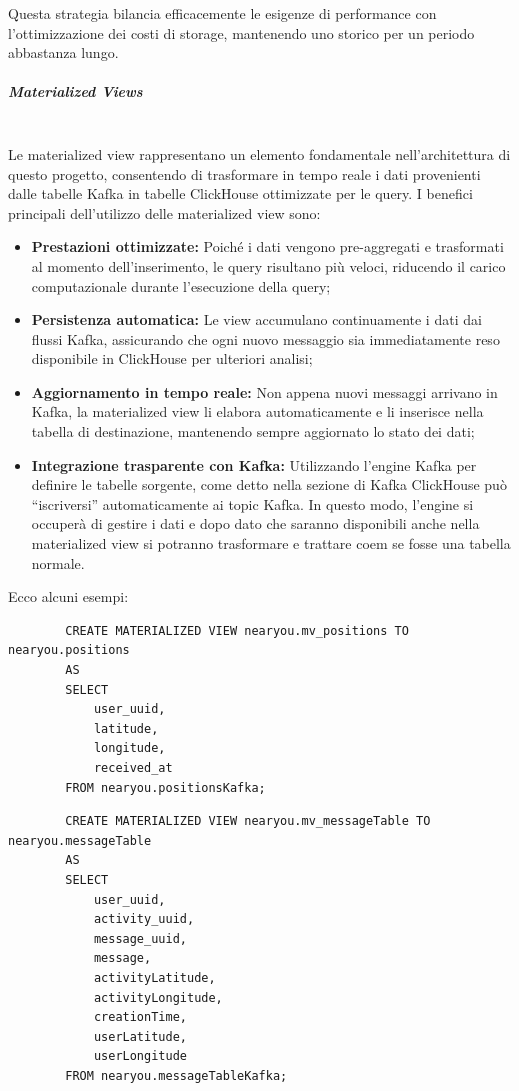 \documentclass[10pt]{article}
\newcommand{\mysubparagraph}[1]{\subparagraph{#1}\mbox{}\\}
\begin{document}
        Questa strategia bilancia efficacemente le esigenze di performance con l'ottimizzazione dei costi di storage, mantenendo uno storico per un periodo abbastanza lungo.

        \mysubparagraph{Materialized Views}
        Le materialized view rappresentano un elemento fondamentale nell'architettura di questo progetto, consentendo di trasformare in tempo reale i dati provenienti dalle tabelle Kafka in tabelle ClickHouse ottimizzate per le query. I benefici principali dell'utilizzo delle materialized view sono:
        \begin{itemize}
            \item \textbf{Prestazioni ottimizzate:} Poiché i dati vengono pre-aggregati e trasformati al momento dell'inserimento, le query risultano più veloci, riducendo il carico computazionale durante l'esecuzione della query;
            \item \textbf{Persistenza automatica:} Le view accumulano continuamente i dati dai flussi Kafka, assicurando che ogni nuovo messaggio sia immediatamente reso disponibile in ClickHouse per ulteriori analisi;
            \item \textbf{Aggiornamento in tempo reale:} Non appena nuovi messaggi arrivano in Kafka, la materialized view li elabora automaticamente e li inserisce nella tabella di destinazione, mantenendo sempre aggiornato lo stato dei dati;
            \item \textbf{Integrazione trasparente con Kafka:} Utilizzando l'engine Kafka per definire le tabelle sorgente, come detto nella sezione di Kafka ClickHouse può “iscriversi” automaticamente ai topic Kafka. In questo modo, l'engine si occuperà di gestire i dati e dopo dato che saranno disponibili anche nella materialized view si potranno trasformare e trattare coem se fosse una tabella normale.
        \end{itemize}
        
        Ecco alcuni esempi:

        \begin{lstlisting}
        CREATE MATERIALIZED VIEW nearyou.mv_positions TO nearyou.positions
        AS
        SELECT
            user_uuid,
            latitude,
            longitude,
            received_at
        FROM nearyou.positionsKafka;
        \end{lstlisting}

        \begin{lstlisting}
        CREATE MATERIALIZED VIEW nearyou.mv_messageTable TO nearyou.messageTable
        AS
        SELECT
            user_uuid,
            activity_uuid,
            message_uuid,
            message,
            activityLatitude,
            activityLongitude,
            creationTime,
            userLatitude,
            userLongitude
        FROM nearyou.messageTableKafka;
        \end{lstlisting}
\end{document}
